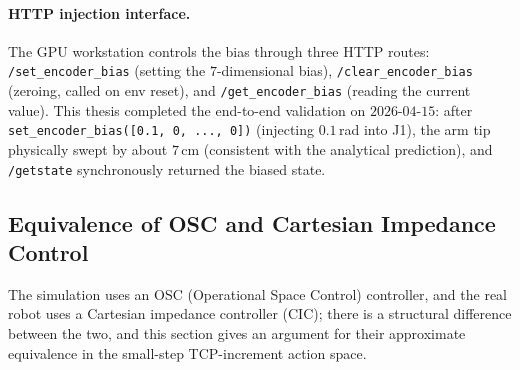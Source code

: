 \paragraph{HTTP injection interface.} The GPU workstation controls the bias through three HTTP routes: \texttt{/set\_encoder\_bias} (setting the $7$-dimensional bias), \texttt{/clear\_encoder\_bias} (zeroing, called on env reset), and \texttt{/get\_encoder\_bias} (reading the current value). This thesis completed the end-to-end validation on $2026$-$04$-$15$: after \texttt{set\_encoder\_bias([0.1, 0, ..., 0])} (injecting $0.1$\,rad into J1), the arm tip physically swept by about $7$\,cm (consistent with the analytical prediction), and \texttt{/getstate} synchronously returned the biased state.

\subsection{Equivalence of OSC and Cartesian Impedance Control}\label{subsec:osc_impedance}

The simulation uses an OSC (Operational Space Control) controller, and the real robot uses a Cartesian impedance controller (CIC); there is a structural difference between the two, and this section gives an argument for their approximate equivalence in the small-step TCP-increment action space.

